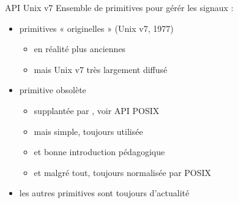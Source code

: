 \begin {frame} {API Unix v7}
    Ensemble de primitives pour gérér les signaux :

    \vspace* {-3mm}


    \vspace* {-2mm}

    \begin {itemize}
	\item primitives « originelles » (Unix v7, 1977)
	    \begin {itemize}
		\item en réalité plus anciennes
		\item mais Unix v7 très largement diffusé

	    \end {itemize}
	\item primitive  obsolète
	    \begin {itemize}
		\item supplantée par , voir API POSIX
		\item mais  simple, toujours utilisée
		\item et bonne introduction pédagogique
		\item et malgré tout, toujours normalisée par POSIX
	    \end {itemize}
	\item les autres primitives sont toujours d'actualité
    \end {itemize}
\end {frame}

